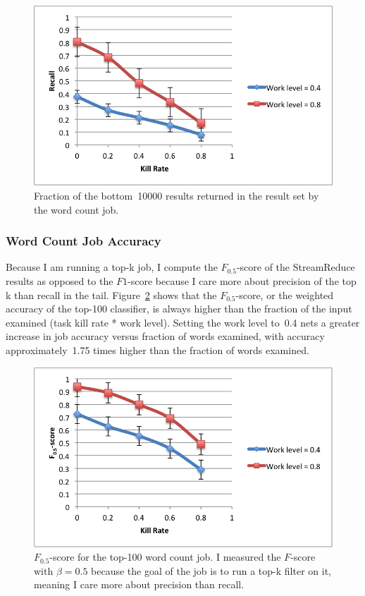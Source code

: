 \documentclass[12pt,twocolumn]{article}
\begin{document}
\begin{figure}
\includegraphics[width=\linewidth]{recall.png}
\caption{Fraction of the bottom~10000 results returned in the result set by the word count
job.}
\label{fig:recall}
\end{figure}


\subsubsection{Word Count Job Accuracy}
Because I am running a top-k job, I compute the $F_{0.5}$-score of the StreamReduce
results as
opposed to the $F1$-score because I care more about precision of the top k than recall
in the tail. Figure~\ref{fig:fscore} shows that the $F_{0.5}$-score, or the weighted
accuracy of the top-100 classifier, is always higher than the fraction of the input
examined (task kill rate * work level). Setting the work level to~0.4 nets a greater increase
in job accuracy versus fraction of words examined, with accuracy approximately~1.75 times
higher than the fraction of words examined.

\begin{figure}
\includegraphics[width=\linewidth]{f-score.png}
\caption{$F_{0.5}$-score for the top-100 word count job. I measured the $F$-score with
$\beta=0.5$ because the goal of the job is to run a top-k filter on it, meaning I care more
about precision than recall.}
\label{fig:fscore}
\end{figure}
\end{document}
